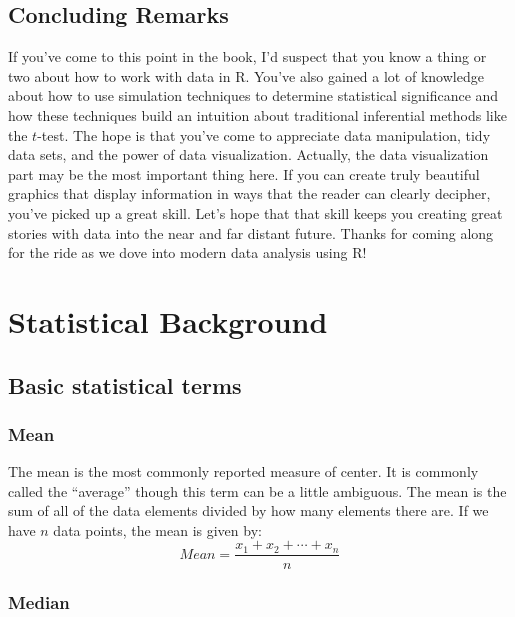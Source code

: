 \documentclass[]{tufte-book}
\theoremstyle{definition}
\theoremstyle{definition}
\theoremstyle{remark}
\begin{document}
\section*{Concluding Remarks}\label{concluding-remarks}

If you've come to this point in the book, I'd suspect that you know a
thing or two about how to work with data in R. You've also gained a lot
of knowledge about how to use simulation techniques to determine
statistical significance and how these techniques build an intuition
about traditional inferential methods like the \(t\)-test. The hope is
that you've come to appreciate data manipulation, tidy data sets, and
the power of data visualization. Actually, the data visualization part
may be the most important thing here. If you can create truly beautiful
graphics that display information in ways that the reader can clearly
decipher, you've picked up a great skill. Let's hope that that skill
keeps you creating great stories with data into the near and far distant
future. Thanks for coming along for the ride as we dove into modern data
analysis using R!

\appendix


\chapter{Statistical Background}\label{appendixA}

\section{Basic statistical terms}\label{basic-statistical-terms}

\subsection{Mean}\label{mean}

The mean is the most commonly reported measure of center. It is commonly
called the ``average'' though this term can be a little ambiguous. The
mean is the sum of all of the data elements divided by how many elements
there are. If we have \(n\) data points, the mean is given by:
\[Mean = \frac{x_1 + x_2 + \cdots + x_n}{n}\]

\subsection{Median}\label{median}
\end{document}
